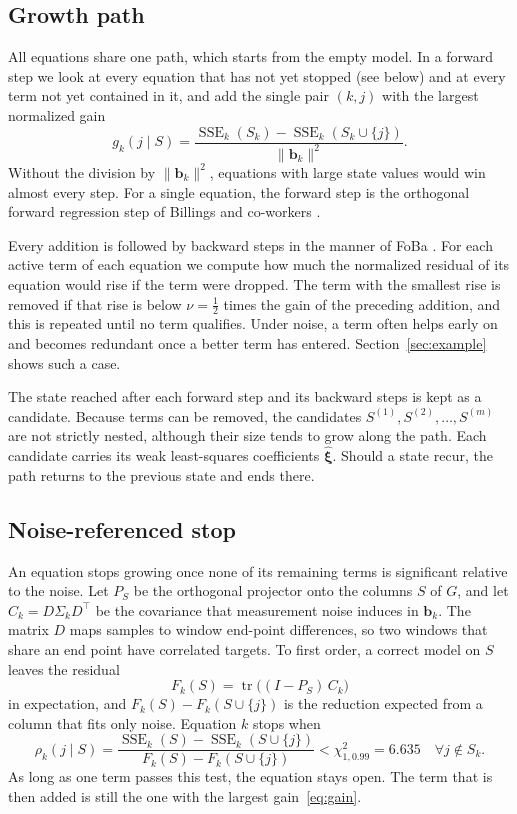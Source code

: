 \documentclass[10pt]{article}
\newcommand{\SSE}{\operatorname{SSE}}
\newcommand{\tr}{\operatorname{tr}}
\begin{document}
\subsection{Growth path}
All equations share one path, which starts from the empty model. In a forward step we look at every equation that has
not yet stopped (see below) and at every term not yet contained in it, and add the single pair $(k,j)$ with the
largest normalized gain
\begin{equation}
g_k(j\mid S)=\frac{\SSE_k(S_k)-\SSE_k(S_k\cup\{j\})}{\lVert\bm b_k\rVert^2}.
\label{eq:gain}
\end{equation}
Without the division by $\lVert\bm b_k\rVert^2$, equations with large state values would win almost every step. For a
single equation, the forward step is the orthogonal forward regression step of Billings and co-workers
\cite{billings1989,chen1989}.

Every addition is followed by backward steps in the manner of FoBa \cite{zhang2011}. For each active term of each
equation we compute how much the normalized residual of its equation would rise if the term were dropped. The term with
the smallest rise is removed if that rise is below $\nu=\tfrac12$ times the gain of the preceding addition, and this is
repeated until no term qualifies. Under noise, a term often helps early on and becomes redundant once a better term has
entered. Section~\ref{sec:example} shows such a case.

The state reached after each forward step and its backward steps is kept as a candidate. Because terms can be removed,
the candidates $S^{(1)},S^{(2)},\dots,S^{(m)}$ are not strictly nested, although their size tends to grow along the
path. Each candidate carries its weak least-squares coefficients $\hat{\bm\xi}$. Should a state recur, the path
returns to the previous state and ends there.

\subsection{Noise-referenced stop}
An equation stops growing once none of its remaining terms is significant relative to the noise. Let $P_S$ be the
orthogonal projector onto the columns $S$ of $G$, and let $C_k=D\Sigma_kD^\top$ be the covariance that measurement
noise induces in $\bm b_k$. The matrix $D$ maps samples to window end-point differences, so two windows that share an
end point have correlated targets. To first order, a correct model on $S$ leaves the residual
\begin{equation}
F_k(S)=\tr\big((I-P_S)\,C_k\big)
\end{equation}
in expectation, and $F_k(S)-F_k(S\cup\{j\})$ is the reduction expected from a column that fits only noise. Equation $k$
stops when
\begin{equation}
\rho_k(j\mid S)=\frac{\SSE_k(S)-\SSE_k(S\cup\{j\})}{F_k(S)-F_k(S\cup\{j\})}<\chi^2_{1,0.99}=6.635\quad\forall j\notin S_k .
\label{eq:stop}
\end{equation}
As long as one term passes this test, the equation stays open. The term that is then added is still the one with the
largest gain~\eqref{eq:gain}.
\end{document}
